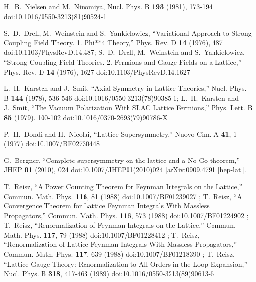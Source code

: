 \documentclass[
article,12pt]{article}
\begin{document}
\begin{thebibliography}{99}
H.~B.~Nielsen and M.~Ninomiya,
Nucl. Phys. B \textbf{193} (1981), 173-194
doi:10.1016/0550-3213(81)90524-1

S.~D.~Drell, M.~Weinstein and S.~Yankielowicz,
``Variational Approach to Strong Coupling Field Theory. 1. Phi**4 Theory,''
Phys. Rev. D \textbf{14} (1976), 487
doi:10.1103/PhysRevD.14.487;
S.~D.~Drell, M.~Weinstein and S.~Yankielowicz,
``Strong Coupling Field Theories. 2. Fermions and Gauge Fields on a Lattice,''
Phys. Rev. D \textbf{14} (1976), 1627
doi:10.1103/PhysRevD.14.1627

L.~H.~Karsten and J.~Smit,
``Axial Symmetry in Lattice Theories,''
Nucl. Phys. B \textbf{144} (1978), 536-546
doi:10.1016/0550-3213(78)90385-1;
L.~H.~Karsten and J.~Smit,
``The Vacuum Polarization With {SLAC} Lattice Fermions,''
Phys. Lett. B \textbf{85} (1979), 100-102
doi:10.1016/0370-2693(79)90786-X

P.~H.~Dondi and H.~Nicolai,
``Lattice Supersymmetry,''
Nuovo Cim. A \textbf{41}, 1 (1977)
doi:10.1007/BF02730448

G.~Bergner,
``Complete supersymmetry on the lattice and a No-Go theorem,''
JHEP \textbf{01} (2010), 024
doi:10.1007/JHEP01(2010)024
[arXiv:0909.4791 [hep-lat]].

T.~Reisz,
``A Power Counting Theorem for Feynman Integrals on the Lattice,''
Commun. Math. Phys. \textbf{116}, 81 (1988)
doi:10.1007/BF01239027
;
T.~Reisz,
``A Convergence Theorem for Lattice Feynman Integrals With Massless Propagators,''
Commun. Math. Phys. \textbf{116}, 573 (1988)
doi:10.1007/BF01224902
;
T.~Reisz,
``Renormalization of Feynman Integrals on the Lattice,''
Commun. Math. Phys. \textbf{117}, 79 (1988)
doi:10.1007/BF01228412
;
T.~Reisz,
``Renormalization of Lattice Feynman Integrals With Massless Propagators,''
Commun. Math. Phys. \textbf{117}, 639 (1988)
doi:10.1007/BF01218390
;
T.~Reisz,
``Lattice Gauge Theory: Renormalization to All Orders in the Loop Expansion,''
Nucl. Phys. B \textbf{318}, 417-463 (1989)
doi:10.1016/0550-3213(89)90613-5



\end{thebibliography}
\end{document}
